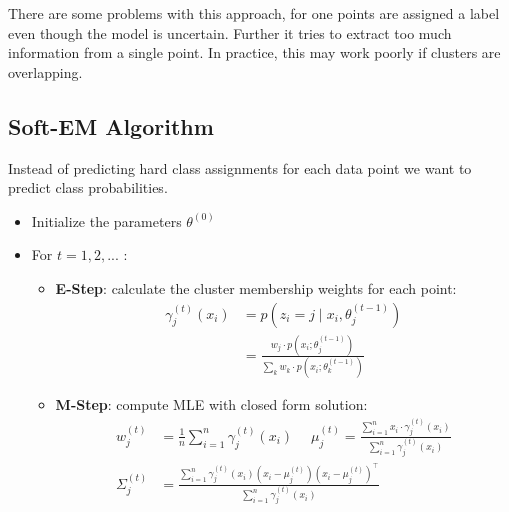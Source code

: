 There are some problems with this approach, for one points are assigned a label even though the model is uncertain. Further it tries to extract too much information from a single point. In practice, this may work poorly if clusters are overlapping.

\subsection{Soft-EM Algorithm}

Instead of predicting hard class assignments for each data point we want to predict class probabilities. 
\begin{itemize}
	\item Initialize the parameters $\theta^{(0)}$
	\item For $t = 1,2,...$ :
		\begin{itemize}
			\item \textbf{E-Step}: calculate the cluster membership weights for each point:
				\begin{align*}
					\gamma_j^{(t)}(x_i) &= p(z_i = j \; | \; x_i, \theta_j^{(t-1)}) \\
					&= \frac{w_j \cdot p(x_i ; \theta_j^{(t-1)})}{\sum_k w_k \cdot p(x_i ; \theta_k^{(t-1)})}
				\end{align*}
			\item \textbf{M-Step}: compute MLE with closed form solution:
				\begin{align*}
			 		w_j^{(t)} &= \frac{1}{n} \sum_{i=1}^n \gamma_j^{(t)}(x_i) \quad \; \mu_j^{(t)} = \frac{\sum_{i=1}^n x_i \cdot \gamma_j^{(t)}(x_i)}{\sum_{i=1}^n \gamma_j^{(t)}(x_i)} \\
			 		\Sigma_j^{(t)} &= \frac{\sum_{i=1}^n \gamma_j^{(t)}(x_i)(x_i - \mu_j^{(t)})(x_i - \mu_j^{(t)})^\top}{\sum_{i=1}^n \gamma_j^{(t)}(x_i)}
			 	\end{align*}
		\end{itemize}
\end{itemize}


